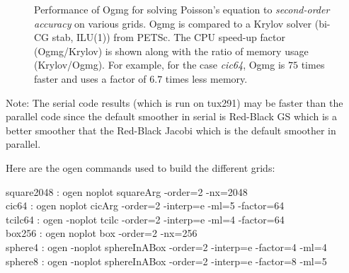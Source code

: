 \begin{figure}[hbt]
\begin{center}
\end{center}
\caption{Performance of Ogmg for solving Poisson's equation to {\em second-order accuracy} on various grids.
Ogmg is compared to a Krylov solver (bi-CG stab, ILU(1)) from PETSc.
  The CPU speed-up factor (Ogmg/Krylov) is shown along with the ratio of memory usage (Krylov/Ogmg). For example,
 for the case {\em cic64}, Ogmg is $75$ times faster and uses a factor of $6.7$ times less memory.}
\label{fig:performanceSecondOrder} 
\end{figure}

Note: The serial code results (which is run on tux291) 
may be faster than the parallel code since the default smoother in serial is Red-Black GS which is a better smoother
that the Red-Black Jacobi which is the default smoother in parallel.


Here are the ogen commands used to build the different grids:
\begin{flushleft}
 square2048 : ogen noplot squareArg -order=2 -nx=2048 \\
 cic64 : ogen noplot cicArg -order=2 -interp=e -ml=5 -factor=64 \\
 tcilc64 : ogen -noplot tcilc -order=2 -interp=e -ml=4 -factor=64 \\
 box256    : ogen noplot box -order=2 -nx=256 \\
 sphere4    : ogen -noplot sphereInABox -order=2 -interp=e -factor=4 -ml=4 \\
 sphere8    : ogen -noplot sphereInABox -order=2 -interp=e -factor=8 -ml=5
\end{flushleft}

